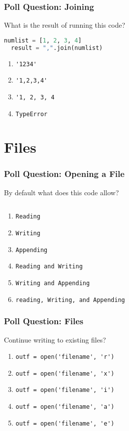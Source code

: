 \documentclass{beamer}
\begin{document}
%
%
\begin{frame}[fragile]
  \frametitle{Poll Question: Joining}
  What is the result of running this code?
  \begin{lstlisting}[language=Python, autogobble]
  numlist = [1, 2, 3, 4]
  result = ",".join(numlist)
  \end{lstlisting}
  \vfill
  \begin{enumerate}[A]
    \item \lstinline|'1234'|
    \item \lstinline|'1,2,3,4'|
    \item \lstinline|'1, 2, 3, 4|
    \item \lstinline|TypeError|
  \end{enumerate}
\end{frame}

\section{Files}

%
%
\begin{frame}[fragile]
  \frametitle{Poll Question: Opening a File}
  By default what does this code allow?
  \begin{lstlisting}[language=Python, autogobble]
  \end{lstlisting}
  \vfill
  \begin{enumerate}[A]
    \item \lstinline|Reading|
    \item \lstinline|Writing|
    \item \lstinline|Appending|
    \item \lstinline|Reading and Writing|
    \item \lstinline|Writing and Appending|
    \item \lstinline|reading, Writing, and Appending|
  \end{enumerate}
\end{frame}

%
%
\begin{frame}[fragile]
  \frametitle{Poll Question: Files}
  Continue writing to existing files?
  \vfill
  \begin{enumerate}[A]
    \item \lstinline|outf = open('filename', 'r')|
    \item \lstinline|outf = open('filename', 'x')|
    \item \lstinline|outf = open('filename', 'i')|
    \item \lstinline|outf = open('filename', 'a')|
    \item \lstinline|outf = open('filename', 'e')|
  \end{enumerate}
\end{frame}
\end{document}
